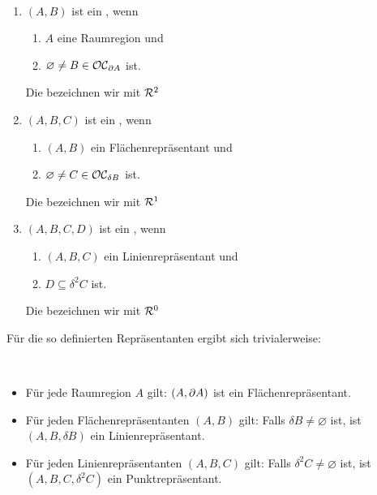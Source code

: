     \begin{dfn}[Repräsentanten]\label{dfn:repr}\ \vspace{0pt}

        \begin{enumerate}
            \item $(A,B)$ ist ein , wenn 
                \begin{enumerate}
                    \item $A$ eine Raumregion und
                    \item $\varnothing \neq B \in \mathcal{OC}_{\partial A}$ ist.
                \end{enumerate}
                Die  bezeichnen wir mit $\mathcal{R}^2$
            \item $(A,B,C)$ ist ein , wenn 
                \begin{enumerate}
                    \item $(A,B)$ ein Flächenrepräsentant und
                    \item $\varnothing \neq C \in \mathcal{OC}_{\delta B}$ ist.
                \end{enumerate}
                Die  bezeichnen wir mit $\mathcal{R}^1$
            \item $(A,B,C,D)$ ist ein , wenn 
                \begin{enumerate}
                    \item $(A,B,C)$ ein Linienrepräsentant und
                    \item $D \subseteq \delta^2 C$ ist.
                \end{enumerate}
                Die  bezeichnen wir mit $\mathcal{R}^0$
        \end{enumerate}
    \end{dfn}
    
    Für die so definierten Repräsentanten ergibt sich trivialerweise:
    
    \begin{satz}\ \vspace{0pt}
    
        \begin{itemize}
            \item Für jede Raumregion $A$ gilt: $(A, \partial A)$ ist ein Flächenrepräsentant.
            \item Für jeden Flächenrepräsentanten $(A,B)$ gilt: 
                Falls $\delta B \neq \varnothing$ ist, ist $(A, B, \delta B)$ ein Linienrepräsentant.
            \item Für jeden Linienrepräsentanten $(A,B,C)$ gilt: 
                Falls $\delta^2 C \neq \varnothing$ ist, ist $(A, B, C, \delta^2 C)$ ein Punktrepräsentant.
        \end{itemize}
        
    \end{satz}
    

